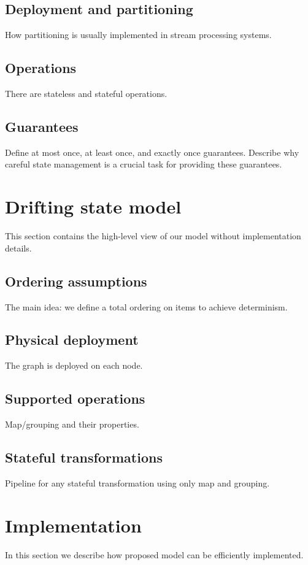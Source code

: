 \documentclass[sigconf]{acmart}
\theoremstyle{remark}
\begin{document}
\subsection{Deployment and partitioning}
How partitioning is usually implemented in stream processing systems.

\subsection{Operations}
There are stateless and stateful operations.

\subsection{Guarantees}
Define at most once, at least once, and exactly once guarantees. Describe why careful state management is a crucial task for providing these guarantees.

\section {Drifting state model}
This section contains the high-level view of our model without implementation details.

\subsection{Ordering assumptions}
The main idea: we define a total ordering on items to achieve determinism.

\subsection{Physical deployment}
The graph is deployed on each node.

\subsection{Supported operations}
Map/grouping and their properties.

\subsection{Stateful transformations}
Pipeline for any stateful transformation using only map and grouping. 

\section {Implementation}
In this section we describe how proposed model can be efficiently implemented.
\end{document}

